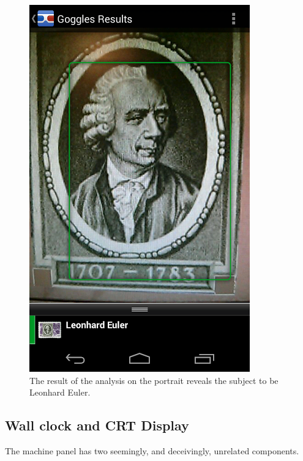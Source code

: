 \begin{figure}[h]
	\centering
	\includegraphics[width=0.8\columnwidth]{img/euler.png}
	\caption{The result of the analysis on the portrait reveals the subject to be Leonhard Euler.}
	\label{fig:euler}
\end{figure}



\subsection{Wall clock and CRT Display}

The machine panel has two seemingly, and deceivingly, unrelated components.

